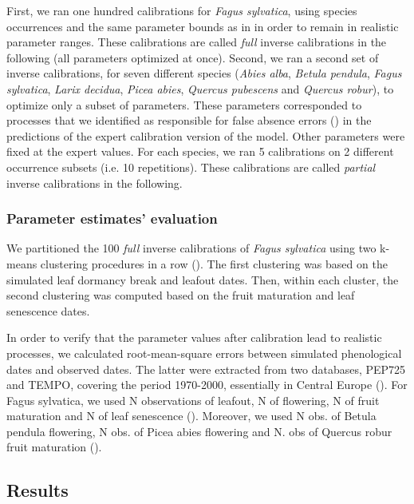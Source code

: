 First, we ran one hundred calibrations for \emph{Fagus sylvatica}, using species occurrences and the same parameter bounds as in \citet{VanderMeersch2023} in order to remain in realistic parameter ranges. These calibrations are called \emph{full} inverse calibrations in the following (all parameters optimized at once). Second, we ran a second set of inverse calibrations, for seven different species (\emph{Abies alba}, \emph{Betula pendula}, \emph{Fagus sylvatica}, \emph{Larix decidua}, \emph{Picea abies}, \emph{Quercus pubescens} and \emph{Quercus robur}), to optimize only a subset of parameters. These parameters corresponded to processes that we identified as responsible for false absence errors () in the predictions of the expert calibration version of the model. Other parameters were fixed at the expert values. For each species, we ran 5 calibrations on 2 different occurrence subsets (i.e. 10 repetitions). These calibrations are called \emph{partial} inverse calibrations in the following. 

\subsubsection{Parameter estimates' evaluation}

We partitioned the 100 \emph{full} inverse calibrations of \emph{Fagus sylvatica} using two k-means clustering procedures in a row (). The first clustering was based on the simulated leaf dormancy break and leafout dates. Then, within each cluster, the second clustering was computed based on the fruit maturation and leaf senescence dates.

In order to verify that the parameter values after calibration lead to realistic processes, we calculated root-mean-square errors between simulated phenological dates and observed dates. The latter were extracted from two databases, PEP725 and TEMPO, covering the period 1970-2000, essentially in Central Europe (). For Fagus sylvatica, we used N observations of leafout, N of flowering, N of fruit maturation and N of leaf senescence (). Moreover, we used N obs. of Betula pendula flowering, N obs. of Picea abies flowering and N. obs of Quercus robur fruit maturation ().


\subsection{Results}

